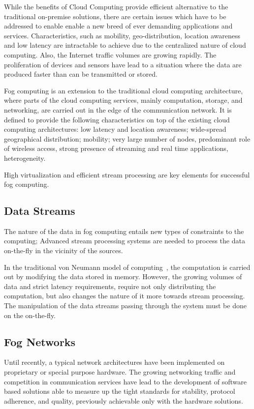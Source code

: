 While the benefits of Cloud Computing provide efficient alternative to the traditional on-premise solutions, there are certain issues which have to be addressed to enable enable a new breed of ever demanding applications and services. Characteristics, such as mobility, geo-distribution, location awareness and low latency are intractable to achieve due to the centralized nature of cloud computing. Also, the Internet traffic volumes are growing rapidly. The proliferation of devices and sensors have lead to a situation where the data are produced faster than can be transmitted or stored.~\cite{bonomi:2012:fog, vaquero:2014:FYW}

Fog computing is an extension to the traditional cloud computing architecture, where parts of the cloud computing services, mainly computation, storage, and networking, are carried out in the edge of the communication network. It is defined to provide the following characteristics on top of the existing cloud computing architectures: low latency and location awareness; wide-spread geographical distribution; mobility; very large number of nodes, predominant role of wireless access, strong presence of streaming and real time applications, heterogeneity.~\cite{bonomi:2012:fog}

High virtualization and efficient stream processing are key elements for successful fog computing.

\subsection{Data Streams}
The nature of the data in fog computing entails new types of constraints to the computing; Advanced stream processing systems are needed to process the data on-the-fly in the vicinity of the sources.~\cite{Bonomi:2012:Fog}

In the traditional von Neumann model of computing~\cite{Neumann:1993:EDVAC}, the computation is carried out by modifying the data stored in memory. However, the growing volumes of data and strict latency requirements, require not only distributing the computation, but also changes the nature of it more towards stream processing. The manipulation of the data streams passing through the system must be done on the on-the-fly.~\cite{Bonomi:2012:Fog, Thies:2002:StreamIt}

\subsection{Fog Networks}
Until recently, a typical network architectures have been implemented on proprietary or special purpose hardware. The growing networking traffic and competition in communication services have lead to the development of software based solutions able to measure up the tight standards for stability, protocol adherence, and quality, previously achievable only with the hardware solutions.~\cite{Kim:2013:SDN}

